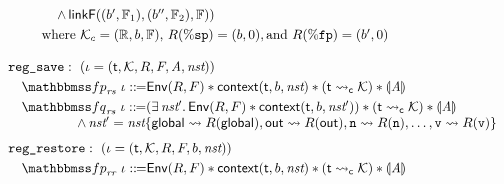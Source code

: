 \begin{figure}[!t]
\[\begin{array}{l}
\begin{array}{lcl}
                    & & \quad
                    \, \land \, 
                    \linkF((\block', \hWstk_1), (\block'', \hWstk_2), \hWstk)
                ) \\
                \\[-9pt]
                \multicolumn{3}{l}
                {
                    \qquad 
                    \text{where} \ 
                    \hthrdlocalst_c = (\hRfile, \block, \hWstk), \, 
                    \RFile(\spreg) = (\block, 0), \text{and } 
                    \RFile(\fpreg) = (\block', 0)
                }
            \end{array} 
            \\
            \\
            \texttt{reg\_save}: \ (\lgvl = (\thrdid, \hthrdlocalst, \RFile, \Wstack, 
            \primcom, \nst)) \\
            \\[-9pt]
            \quad 
            \relspecpre_{\textit{rs}} \ \lgvl \define 
            \Env{\RFile, \Wstack} \sepstar 
            \context{\thrdid, \block, \nst} \sepstar 
            (\astCurCont{\thrdid}{\hthrdlocalst}) \sepstar \safePrimAst{\primcom} \\
            \\[-9pt]
            \quad
            \relspecpost_{\textit{rs}} \ \lgvl \define 
            (\exists \, \nst'. \, \Env{\RFile, \Wstack} \sepstar
            \relcontext{\thrdid}{\block}{\nst'}) \sepstar 
            (\astCurCont{\thrdid}{\hthrdlocalst}) \sepstar \safePrimAst{\primcom} \\
            \hspace*{5em}
            \, \land \, 
            \nst' = \nst\{ \globalRN \rightsquigarrow \RFile(\globalRN), 
                \outRN \rightsquigarrow \RFile(\outRN), 
                \regn \rightsquigarrow \RFile(\regn), \dots, 
                \regv \rightsquigarrow \RFile(\regv) \}  \\
            \\[-5pt]
            \texttt{reg\_restore}: \ (\lgvl = (\thrdid, \hthrdlocalst, \RFile, \Wstack, 
                \block, \nst)) \\
            \\[-9pt]
            \quad
            \relspecpre_{\textit{rr}} \ \lgvl \define \Env{\RFile, \Wstack} \sepstar 
            \relcontext{\thrdid}{\block}{\nst} \sepstar 
            (\astCurCont{\thrdid}{\hthrdlocalst}) \sepstar \safePrimAst{\primcom} \\

\end{array}\]
\end{figure}
